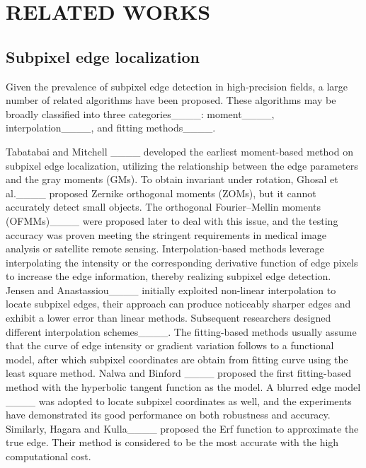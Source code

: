 \section{RELATED WORKS}
\label{sec2}
\subsection{Subpixel edge localization}
Given the prevalence of subpixel edge detection in high-precision fields, a large number of related algorithms have been proposed. These algorithms may be broadly classified into three categories____: moment____, interpolation____, and fitting methods____.

Tabatabai and Mitchell ____ developed the earliest moment-based method on subpixel edge localization, utilizing the relationship between the edge parameters and the gray moments (GMs). 
To obtain invariant under rotation, Ghosal et al.____ proposed Zernike orthogonal moments (ZOMs), but it cannot accurately detect small objects. The orthogonal Fourier–Mellin moments (OFMMs)____ were proposed later to deal with this issue, and the testing accuracy was proven meeting the stringent requirements in medical image analysis or satellite remote sensing. 
Interpolation-based methods leverage interpolating the intensity or the corresponding derivative function of edge pixels to increase the edge information, thereby realizing subpixel edge detection. 
Jensen and Anastassiou____ initially exploited non-linear interpolation to locate subpixel edges, their approach can produce noticeably sharper edges and exhibit a lower error than linear methods. 
Subsequent researchers designed different interpolation schemes____. 
The fitting-based methods usually assume that the curve of edge intensity or gradient variation follows to a functional model, after which subpixel coordinates are obtain from fitting curve using the least square method. 
Nalwa and Binford ____ proposed the first fitting-based method with the hyperbolic tangent function as the model. A blurred edge model ____ was adopted to locate subpixel coordinates as well, and the experiments have demonstrated its good performance on both robustness and accuracy.
Similarly, Hagara and Kulla____ proposed the Erf function to approximate the true edge. Their method is considered to be the most accurate with the high computational cost. 

